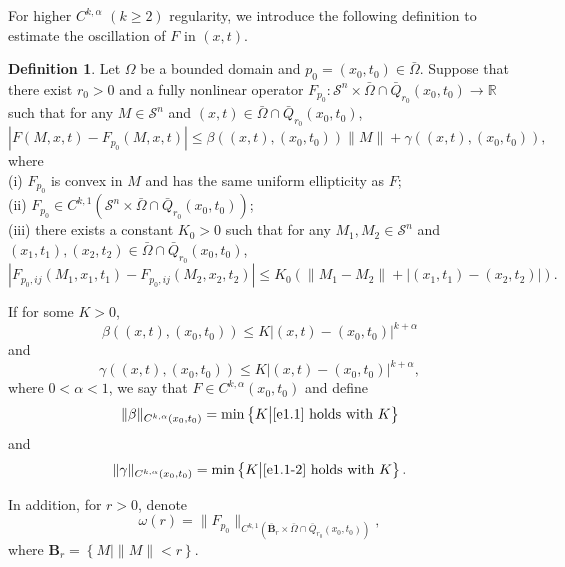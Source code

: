 \documentclass[preprint,12pt]{elsarticle}
\theoremstyle{definition}
\newtheorem{definition}[theorem]{Definition}
\theoremstyle{remark}
\numberwithin{equation}{section}
\begin{document}
For higher $C^{k,\alpha}$ $(k\geq 2)$ regularity, we introduce the following definition to estimate the oscillation of $F$ in $(x,t)$.
\begin{definition}\label{d-FP-Ck}
Let  $\Omega$ be a bounded domain and $p_0=(x_0,t_0)\in \bar{\Omega}$. Suppose that there exist $r_0>0$ and a fully nonlinear operator $F_{p_0}:\mathcal{S}^{n}\times \bar\Omega\cap \bar Q_{r_0}(x_0,t_0)\rightarrow \mathbb{R}$ such that for any $M\in \mathcal{S}^{n}$ and $(x,t)\in \bar\Omega\cap \bar Q_{r_0}(x_0,t_0)$,
\begin{equation}\label{e.Cka.beta}
|F(M,x,t)-F_{p_0}(M,x,t)|\leq \beta((x,t),(x_0,t_0)) \|M\|+\gamma((x,t),(x_0,t_0)),
\end{equation}
where \\
(i) $F_{p_0}$ is convex in $M$ and has the same uniform ellipticity as $F$;\\
(ii) $F_{p_0} \in C^{k,1}(\mathcal{S}^n\times \bar{\Omega}\cap \bar{Q}_{r_0}(x_0,t_0))$;\\
(iii) there exists a constant $K_0>0$ such that for any $M_1,M_2\in \mathcal{S}^{n}$ and $(x_1,t_1),(x_2,t_2)\in \bar\Omega\cap \bar Q_{r_0}(x_0,t_0)$,
\begin{equation}\label{e1.8}
|F_{p_0,ij}(M_1,x_1,t_1)-F_{p_0,ij}(M_2,x_2,t_2)|\leq K_0 (\|M_1-M_2\|+|(x_1,t_1)-(x_2,t_2)|).
\end{equation}

If for some $K>0$,
\begin{equation}\label{e1.1}
\beta((x,t),(x_0,t_0))\leq K|(x,t)-(x_0,t_0)|^{k+\alpha}
\end{equation}
and
\begin{equation}\label{e1.1-2}
\gamma((x,t),(x_0,t_0))\leq K|(x,t)-(x_0,t_0)|^{k+\alpha},
\end{equation}
where $0<\alpha<1$, we say that $F\in C^{k,\alpha}(x_0,t_0)$ and define
\begin{equation*}
  \|\beta\|_{C^{k,\alpha}(x_0,t_0)}=\min \left\{K\big | \cref{e1.1} ~\mbox{holds with}~K\right\}
\end{equation*}
and
\begin{equation*}
  \|\gamma\|_{C^{k,\alpha}(x_0,t_0)}=\min \left\{K\big | \cref{e1.1-2} ~\mbox{holds with}~K\right\}.
\end{equation*}

In addition, for $r>0$, denote
\begin{equation*}
\omega(r)=\|F_{p_0}\|_{C^{k,1}(\bar{\textbf{B}}_r\times \bar\Omega\cap \bar Q_{r_0}(x_0,t_0))},
\end{equation*}
where $\textbf{B}_r=\left\{M\big| \|M\|<r\right\}$.


\end{definition}
\end{document}
